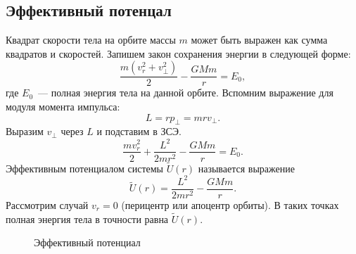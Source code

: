\subsection{Эффективный потенцал}

Квадрат скорости тела на орбите массы $m$ может быть выражен как сумма квадратов  и  скоростей. Запишем закон сохранения энергии в следующей форме:
\begin{equation*}
	\frac{m(v^2_r + v^2_{\perp})}{2} - \frac{GMm}{r} = E_0,
\end{equation*}
где $E_0$~--- полная энергия тела на данной орбите. Вспомним выражение для модуля момента импульса:
\begin{equation}
	L = r p_{\perp} = mr v_{\perp}.
\end{equation}
Выразим $v_{\perp}$ через $L$ и подставим в ЗСЭ.
\begin{equation}
	\frac{m v^2_r}{2} + \frac{L^2}{2mr^2} - \frac{GMm}{r} = E_0.
\end{equation}
Эффективным потенциалом системы $\tilde{U}(r)$ называется выражение
\begin{equation}
	\tilde{U}(r) = \frac{L^2}{2mr^2} - \frac{GMm}{r}.
\end{equation}
Рассмотрим случай $v_r=0$ (перицентр или апоцентр орбиты). В таких точках полная энергия тела в точности равна $\tilde{U}(r)$.

\begin{wrapfigure}[10]{r}{0.47\tw}
    \centering
    \caption{Эффективный потенциал}
    \label{pic:effitient-potential-plot}
\end{wrapfigure} 

